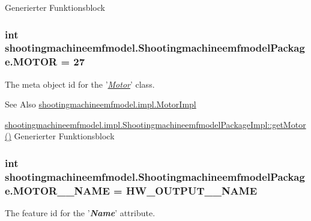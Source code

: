 Generierter Funktionsblock  \hypertarget{interfaceshootingmachineemfmodel_1_1_shootingmachineemfmodel_package_a9144b6eba68be5a47fdd021422d73dbd}{
\subsubsection[{M\-O\-T\-O\-R}]{\setlength{\rightskip}{0pt plus 5cm}int shootingmachineemfmodel.\-Shootingmachineemfmodel\-Package.\-M\-O\-T\-O\-R = 27}}\label{interfaceshootingmachineemfmodel_1_1_shootingmachineemfmodel_package_a9144b6eba68be5a47fdd021422d73dbd}
The meta object id for the '\hyperlink{classshootingmachineemfmodel_1_1impl_1_1_motor_impl}{{\itshape Motor}}' class.

\begin{DoxySeeAlso}{See Also}
\hyperlink{classshootingmachineemfmodel_1_1impl_1_1_motor_impl}{shootingmachineemfmodel.\-impl.\-Motor\-Impl} 

\hyperlink{classshootingmachineemfmodel_1_1impl_1_1_shootingmachineemfmodel_package_impl_a4821ab45885bc62267d5bb70879d0262}{shootingmachineemfmodel.\-impl.\-Shootingmachineemfmodel\-Package\-Impl\-::get\-Motor()} Generierter Funktionsblock 
\end{DoxySeeAlso}
\hypertarget{interfaceshootingmachineemfmodel_1_1_shootingmachineemfmodel_package_a0a00df33c791b334924d8650e4c3a8bb}{
\subsubsection[{M\-O\-T\-O\-R\-\_\-\-\_\-\-N\-A\-M\-E}]{\setlength{\rightskip}{0pt plus 5cm}int shootingmachineemfmodel.\-Shootingmachineemfmodel\-Package.\-M\-O\-T\-O\-R\-\_\-\-\_\-\-N\-A\-M\-E = {\bf H\-W\-\_\-\-O\-U\-T\-P\-U\-T\-\_\-\-\_\-\-N\-A\-M\-E}}}\label{interfaceshootingmachineemfmodel_1_1_shootingmachineemfmodel_package_a0a00df33c791b334924d8650e4c3a8bb}
The feature id for the '{\itshape {\bfseries Name}}' attribute.


